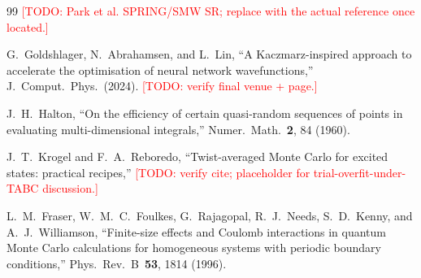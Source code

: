 \documentclass[reprint,amsmath,amssymb,aps,prb,floatfix,nofootinbib]{revtex4-2}
\newcommand{\todo}[1]{\textcolor{red}{[TODO: #1]}}
\begin{document}
\begin{thebibliography}{99}
\todo{Park et al. SPRING/SMW SR; replace with the actual reference
once located.}

G.~Goldshlager, N.~Abrahamsen, and L.~Lin,
``A Kaczmarz-inspired approach to accelerate the optimisation of
neural network wavefunctions,''
J.~Comput.~Phys.~(2024).
\todo{verify final venue + page.}

J.~H.~Halton,
``On the efficiency of certain quasi-random sequences of points in
evaluating multi-dimensional integrals,''
Numer.~Math.~\textbf{2}, 84 (1960).

J.~T.~Krogel and F.~A.~Reboredo,
``Twist-averaged Monte Carlo for excited states: practical
recipes,''
\todo{verify cite; placeholder for trial-overfit-under-TABC
discussion.}

L.~M.~Fraser, W.~M.~C.~Foulkes, G.~Rajagopal, R.~J.~Needs,
S.~D.~Kenny, and A.~J.~Williamson,
``Finite-size effects and Coulomb interactions in quantum Monte
Carlo calculations for homogeneous systems with periodic boundary
conditions,''
Phys.~Rev.~B~\textbf{53}, 1814 (1996).

\end{thebibliography}
\end{document}
